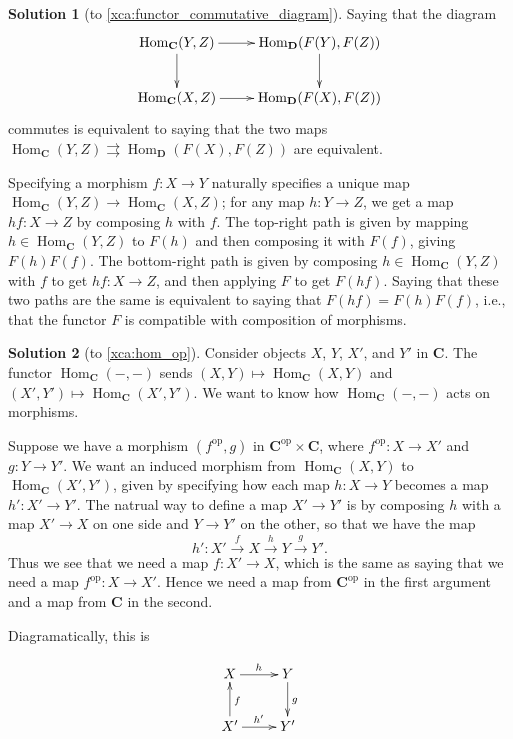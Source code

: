 \documentclass{amsart}
\theoremstyle{definition} \newaliasedtheorem{defn}[thm]{Definition}
\theoremstyle{definition} \newtheorem*{defn*}{Definition}
\theoremstyle{definition} \newaliasedtheorem{xca}[thm]{Exercise}
\theoremstyle{definition} \newtheorem*{soln*}{Solution}
\theoremstyle{definition} \newaliasedtheorem{remark}[thm]{Remark}
\theoremstyle{definition} \newtheorem*{remark*}{Remark}
\newcommand{\cat}[1]{\ensuremath{\mathbf{#1}}}
\DeclareMathOperator{\Hom}{Hom}
\begin{document}
    \begin{soln*}[to \autoref{xca:functor_commutative_diagram}] \label{sol:functor_commutative_diagram}
      Saying that the diagram
      \[
        \xymatrix{
          \Hom_{\cat C}(Y, Z) \ar[r] \ar[d] & \Hom_{\cat D}(F(Y), F(Z)) \ar[d] \\
          \Hom_{\cat C}(X, Z) \ar[r] & \Hom_{\cat D}(F(X), F(Z))
        }
      \]
      commutes is equivalent to saying that the two maps $\Hom_{\cat C}(Y, Z)\rightrightarrows \Hom_{\cat D}(F(X), F(Z))$ are equivalent.
      
      Specifying a morphism $f: X \to Y$ naturally specifies a unique map $\Hom_{\cat C}(Y, Z) \to \Hom_{\cat C}(X, Z)$; for any map $h : Y \to Z$, we get a map $hf : X \to Z$ by composing $h$ with $f$.  The top-right path is given by mapping $h\in \Hom_{\cat C}(Y, Z)$ to $F(h)$ and then composing it with $F(f)$, giving $F(h)F(f)$.  The bottom-right path is given by composing $h\in \Hom_{\cat C}(Y, Z)$ with $f$ to get $hf : X \to Z$, and then applying $F$ to get $F(hf)$.  Saying that these two paths are the same is equivalent to saying that $F(hf) = F(h)F(f)$, i.e., that the functor $F$ is compatible with composition of morphisms.
    \end{soln*}
    
    \begin{soln*}[to \autoref{xca:hom_op}] \label{sol:hom_op}
      Consider objects $X$, $Y$, $X'$, and $Y'$ in $\cat C$.  The functor $\Hom_{\cat C}(-, -)$ sends $(X, Y) \mapsto \Hom_{\cat C}(X, Y)$ and $(X', Y') \mapsto \Hom_{\cat C}(X', Y')$.  We want to know how $\Hom_{\cat C}(-, -)$ acts on morphisms.
      
      Suppose we have a morphism $(f^\text{op}, g)$ in $\cat C^\text{op} \times \cat C$, where $f^\text{op} : X \to X'$ and $g : Y \to Y'$.  We want an induced morphism from $\Hom_{\cat C}(X, Y)$ to $\Hom_{\cat C}(X', Y')$, given by specifying how each map $h: X \to Y$ becomes a map $h': X' \to Y'$.  The natrual way to define a map $X' \to Y'$ is by composing $h$ with a map $X' \to X$ on one side and $Y \to Y'$ on the other, so that we have the map
      \[
        h' : X' \xrightarrow{f} X \xrightarrow{h} Y \xrightarrow{g} Y'.
      \]
      Thus we see that we need a map $f : X' \to X$, which is the same as saying that we need a map $f^\text{op} : X \to X'$.  Hence we need a map from $\cat C^\text{op}$ in the first argument and a map from $\cat C$ in the second.
      
      Diagramatically, this is
      
    \[
      \xymatrix{
        X \ar[r]^h & Y \ar[d]^g \\
        X' \ar[u]_{f} \ar[r]^{h'} & Y' \\
      }
    \]
      
    \end{soln*}
    
\end{document}
